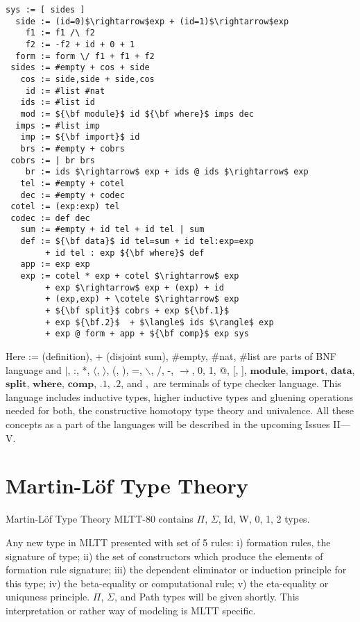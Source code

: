 \documentclass{article}
\theoremstyle{definition}
\begin{document}
\begin{lstlisting}[mathescape=true]
   sys := [ sides ]
  side := (id=0)$\rightarrow$exp + (id=1)$\rightarrow$exp
    f1 := f1 /\ f2
    f2 := -f2 + id + 0 + 1
  form := form \/ f1 + f1 + f2
 sides := #empty + cos + side
   cos := side,side + side,cos
    id := #list #nat
   ids := #list id
   mod := ${\bf module}$ id ${\bf where}$ imps dec
  imps := #list imp
   imp := ${\bf import}$ id
   brs := #empty + cobrs
 cobrs := | br brs
    br := ids $\rightarrow$ exp + ids @ ids $\rightarrow$ exp
   tel := #empty + cotel
   dec := #empty + codec
 cotel := (exp:exp) tel
 codec := def dec
   sum := #empty + id tel + id tel | sum
   def := ${\bf data}$ id tel=sum + id tel:exp=exp
        + id tel : exp ${\bf where}$ def
   app := exp exp
   exp := cotel * exp + cotel $\rightarrow$ exp
        + exp $\rightarrow$ exp + (exp) + id
        + (exp,exp) + \cotele $\rightarrow$ exp
        + ${\bf split}$ cobrs + exp ${\bf.1}$
        + exp ${\bf.2}$  + $\langle$ ids $\rangle$ exp
        + exp @ form + app + ${\bf comp}$ exp sys
\end{lstlisting}

Here := (definition), + (disjoint sum), \#empty, \#nat, \#list are parts of BNF language and
$\rvert$, :, *, $\langle$, $\rangle$, (, ), =, $\backslash$, /, -, $\rightarrow$, 0, 1, @, [, ],
$\mathbf{module}$, $\mathbf{import}$,
$\mathbf{data}$, $\mathbf{split}$, $\mathbf{where}$, $\mathbf{comp}$, $\mathbf{.1}$, $\mathbf{.2}$,
 and $,$ are terminals of type checker language. This language includes
inductive types, higher inductive types and gluening operations needed for
both, the constructive homotopy type theory and univalence. All these concepts as a part of the languages
will be described in the upcoming Issues II---V.

\section{Martin-Löf Type Theory}

Martin-Löf Type Theory MLTT-80 contains $\Pi$, $\Sigma$, Id, W, 0, 1, 2 types.

Any new type in MLTT presented with set of 5 rules: i) formation rules, the signature of type;
ii) the set of constructors which produce the elements of formation rule signature;
iii) the dependent eliminator or induction principle for this type;
iv) the beta-equality or computational rule;
v) the eta-equality or uniquness principle. $\Pi$, $\Sigma$, and Path
types will be given shortly. This interpretation or rather way of modeling is MLTT specific.
\end{document}

